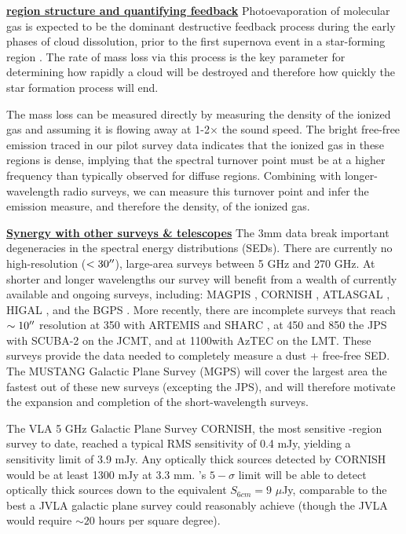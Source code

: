 \documentclass[11pt,preprint]{aastex_nofoot}
\begin{document}
\indent\underline{\textbf{\helv \hii region structure and quantifying feedback}} 
Photoevaporation of molecular gas is expected to be the dominant
destructive feedback process during the early phases of cloud dissolution,
prior to the first supernova event in a star-forming region \citep{Matzner2015a}.
The rate of mass loss via this process is the key parameter for determining
how rapidly a cloud will be destroyed and therefore how quickly the star
formation process will end. 

The mass loss can be measured directly by measuring the density of the ionized
gas and assuming it is flowing away at 1-2$\times$ the sound speed.  The bright
free-free emission traced in our pilot survey data indicates that the ionized
gas in these regions is dense, implying that the spectral turnover point must
be at a higher frequency than typically observed for diffuse \hii regions.
Combining \MUSTANG with longer-wavelength radio surveys, we can measure this
turnover point and infer the emission measure, and therefore the density, of
the ionized gas.







\indent\underline{\textbf{\helv Synergy with other surveys \& telescopes}} 
The 3mm data break important degeneracies in the spectral energy distributions
(SEDs). There are currently no high-resolution ($<30\mbox{$^{\prime\prime}$}$), large-area
surveys between 5 GHz and 270 GHz.  At shorter and longer wavelengths our
survey will benefit from a wealth of currently available and ongoing surveys,
including: MAGPIS \citep{Helfand2006a}, CORNISH \citep{Hoare2012a}, ATLASGAL
\citep{Schuller2009a},  HIGAL \citep{Molinari2010a}, and the BGPS
\citep[][]{Aguirre2011a,Ginsburg2013a}.  More recently, there are incomplete
surveys that reach $\sim10\mbox{$^{\prime\prime}$}$ resolution at 350 \um with ARTEMIS and SHARC
\citep[e.g.][]{Lin2016a}, at 450 and 850 \um the JPS with SCUBA-2 on the JCMT,
and at 1100\um with AzTEC on the LMT. These surveys provide the data needed to
completely measure a dust + free-free SED.  The MUSTANG Galactic Plane Survey
(MGPS) will cover the largest area the fastest out of these new surveys
(excepting the JPS), and will therefore motivate the expansion and completion
of the short-wavelength surveys.

The VLA 5 GHz Galactic Plane Survey CORNISH, the most sensitive \uchii-region
survey to date, reached a typical RMS sensitivity of 0.4 mJy, yielding a
sensitivity limit of 3.9 mJy.  Any optically thick sources detected by CORNISH
would be at least 1300 mJy at 3.3 mm.  \MUSTANG’s $5-\sigma$ limit will be able
to detect optically thick sources down to the equivalent $S_{6cm} = 9$ $\mu$Jy,
comparable to the best a JVLA galactic plane survey could reasonably achieve
(though the JVLA would require $\sim20$ hours per square degree).
\end{document}
